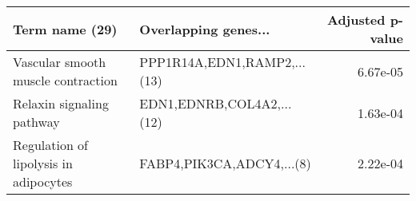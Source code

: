 \begin{tabular}{llr}
\toprule
                       Term name (29) &        Overlapping genes... &  Adjusted p-value \\
\midrule
   Vascular smooth muscle contraction & PPP1R14A,EDN1,RAMP2,...(13) &          6.67e-05 \\
            Relaxin signaling pathway &   EDN1,EDNRB,COL4A2,...(12) &          1.63e-04 \\
Regulation of lipolysis in adipocytes &   FABP4,PIK3CA,ADCY4,...(8) &          2.22e-04 \\
\bottomrule
\end{tabular}
